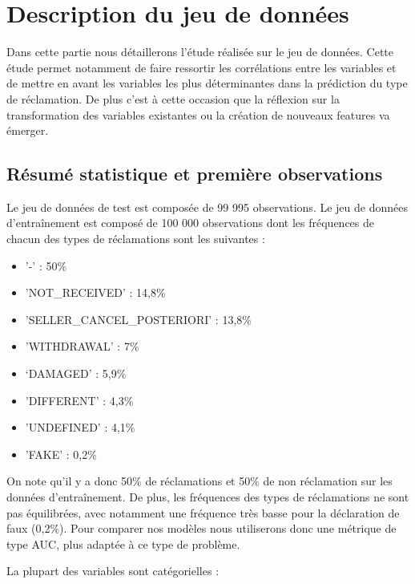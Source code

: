 
\chapter{Description du jeu de données}

Dans cette partie nous détaillerons l'étude réalisée sur le jeu de données.
Cette étude permet notamment de faire ressortir les corrélations entre les variables
et de mettre en avant les variables les plus déterminantes dans la prédiction du type de 
réclamation. De plus c'est à cette occasion que la réflexion sur la transformation des variables
existantes ou la création de nouveaux features va émerger.

\section{Résumé statistique et première observations}

Le jeu de données de test est composée de 99 995 observations.
Le jeu de données d'entraînement est composé de 100 000 observations dont les fréquences 
de chacun des types de réclamations sont les suivantes :

\begin{itemize}
\item '-' : 50\% 
\item 'NOT_RECEIVED' : 14,8\%
\item 'SELLER_CANCEL_POSTERIORI' : 13,8\%
\item 'WITHDRAWAL' : 7\%
\item ‘DAMAGED' : 5,9\%
\item 'DIFFERENT' : 4,3\%
\item 'UNDEFINED' : 4,1\%
\item 'FAKE' : 0,2\%
\end{itemize}

On note qu'il y a donc 50\% de réclamations et 50\% de non réclamation sur les données 
d'entraînement. De plus, les fréquences des types de réclamations ne sont pas équilibrées,
avec notamment une fréquence très basse pour la déclaration de faux (0,2\%). Pour comparer
nos modèles nous utiliserons donc une métrique de type AUC, plus adaptée à ce type de 
problème. 

La plupart des variables sont catégorielles :

